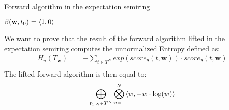 \documentclass[a4paper,12pt]{ETHexercise}
\begin{document}
\begin{algorithm}
    \SetAlgoLined
    \caption{Forward algorithm in the expectation semiring}
    \label{alg:forward_expectation}
    $\beta(\textbf{w}, t_0) = \left\langle1, 0\right\rangle$\\
\end{algorithm}
We want to prove that the result of the forward algorithm lifted in the expectation semiring computes the unnormalized Entropy defined as:
\begin{align}
    H_u(T_\textbf{w}) &= -\sum_{t \in T^N} exp(score_\theta(t,\textbf{w})) \cdot score_\theta(t,\textbf{w})\\
\end{align}
The lifted forward algorithm is then equal to:
\begin{align}
    \bigoplus_{t_{1:N} \in T^N} \bigotimes_{n=1}^N \left\langle w, -w \cdot \log(w)\right\rangle
\end{align}
\end{document}
